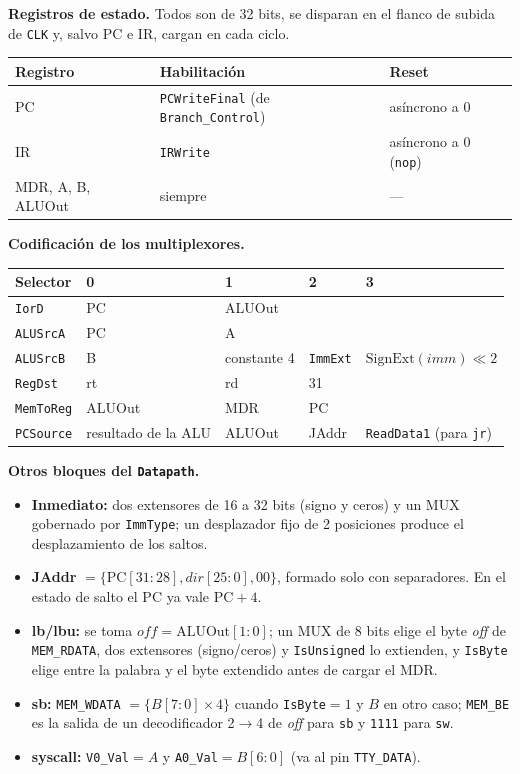 \documentclass[10pt,a4paper]{article}
\newcommand{\s}[1]{\texttt{#1}}
\begin{document}
\noindent\textbf{Registros de estado.} Todos son de 32 bits, se disparan en el flanco de
subida de \s{CLK} y, salvo PC e IR, cargan en cada ciclo.

\begin{center}\small
\begin{tabular}{@{}lll@{}}
\toprule
Registro & Habilitación & Reset \\
\midrule
PC & \s{PCWriteFinal} (de \s{Branch\_Control}) & asíncrono a 0 \\
IR & \s{IRWrite} & asíncrono a 0 (\s{nop}) \\
MDR, A, B, ALUOut & siempre & --- \\
\bottomrule
\end{tabular}
\end{center}

\noindent\textbf{Codificación de los multiplexores.}

\begin{center}\small
\begin{tabular}{@{}lllll@{}}
\toprule
Selector & 0 & 1 & 2 & 3 \\
\midrule
\s{IorD} & PC & ALUOut & & \\
\s{ALUSrcA} & PC & A & & \\
\s{ALUSrcB} & B & constante 4 & \s{ImmExt} & $\mathrm{SignExt}(imm)\ll 2$ \\
\s{RegDst} & rt & rd & 31 & \\
\s{MemToReg} & ALUOut & MDR & PC & \\
\s{PCSource} & resultado de la ALU & ALUOut & JAddr & \s{ReadData1} (para \s{jr}) \\
\bottomrule
\end{tabular}
\end{center}

\noindent\textbf{Otros bloques del \s{Datapath}.}
\begin{itemize}
\item \textbf{Inmediato:} dos extensores de 16 a 32 bits (signo y ceros) y un MUX
gobernado por \s{ImmType}; un desplazador fijo de 2 posiciones produce el
desplazamiento de los saltos.
\item \textbf{JAddr} $=\{\mathrm{PC}[31{:}28], \mathit{dir}[25{:}0], 00\}$, formado
solo con separadores. En el estado de salto el PC ya vale $\mathrm{PC}+4$.
\item \textbf{lb/lbu:} se toma $\mathit{off}=\mathrm{ALUOut}[1{:}0]$; un MUX de 8 bits
elige el byte \textit{off} de \s{MEM\_RDATA}, dos extensores (signo/ceros) y
\s{IsUnsigned} lo extienden, y \s{IsByte} elige entre la palabra y el byte extendido
antes de cargar el MDR.
\item \textbf{sb:} \s{MEM\_WDATA} $= \{B[7{:}0]\times 4\}$ cuando \s{IsByte}$=1$
y $B$ en otro caso; \s{MEM\_BE} es la salida de un decodificador 2$\to$4 de
\textit{off} para \s{sb} y \s{1111} para \s{sw}.
\item \textbf{syscall:} \s{V0\_Val}$=A$ y \s{A0\_Val}$=B[6{:}0]$ (va al pin \s{TTY\_DATA}).
\end{itemize}
\end{document}
